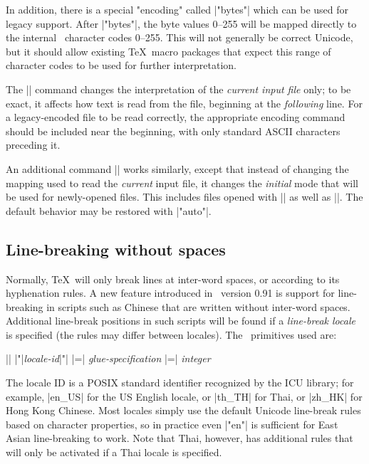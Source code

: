 In addition, there is a special "encoding" called |"bytes"| which can be used for legacy support. After |\XeTeXinputencoding "bytes"|, the byte values 0–255 will be mapped directly to the internal \XeTeX\ character codes 0–255. This will not generally be correct Unicode, but it should allow existing \TeX\ macro packages that expect this range of character codes to be used for further interpretation.

The |\XeTeXinputencoding| command changes the interpretation of the {\em current input file} only; to be exact, it affects how text is read from the file, beginning at the {\em following} line. For a legacy-encoded file to be read correctly, the appropriate encoding command should be included near the beginning, with only standard ASCII characters preceding it.

An additional command |\XeTeXdefaultencoding| works similarly, except that instead of changing the mapping used to read the {\em current} input file, it changes the {\em initial} mode that will be used for newly-opened files. This includes files opened with |\openin| as well as ||. The default behavior may be restored with |\XeTeXdefaultencoding "auto"|.

\subsection{Line-breaking without spaces}

\CMDI{\XeTeXlinebreaklocale}

Normally, \TeX\ will only break lines at inter-word spaces, or according to its hyphenation rules. A new feature introduced in \XeTeX\ version 0.91 is support for line-breaking in scripts such as Chinese that are written without inter-word spaces. Additional line-break positions in such scripts will be found if a {\em line-break locale} is specified (the rules may differ between locales). The \XeTeX\ primitives used are:%
{\obeylines \parskip0pt \parindent
  |\XeTeXlinebreaklocale| |"|{\em locale-id}|"|
  |\XeTeXlinebreakskip =| {\em glue-specification}
  |\XeTeXlinebreakpenalty =| {\em integer}\par}\noindent
The locale ID is a POSIX standard identifier recognized by the ICU library; for example, |en_US| for the US English locale, or |th_TH| for Thai, or |zh_HK| for Hong Kong Chinese. Most locales simply use the default Unicode line-break rules based on character properties, so in practice even |\XeTeXlinebreaklocale "en"| is sufficient for East Asian line-breaking to work. Note that Thai, however, has additional rules that will only be activated if a Thai locale is specified.


